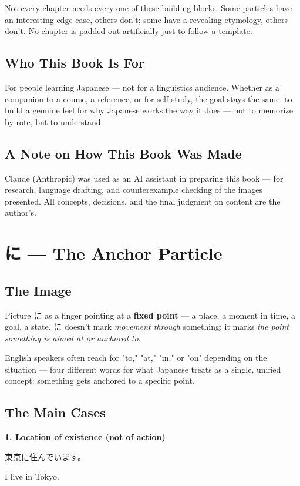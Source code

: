 \documentclass[12pt]{book}
\begin{document}
Not every chapter needs every one of these building blocks. Some particles have an interesting edge case, others don't; some have a revealing etymology, others don't. No chapter is padded out artificially just to follow a template.

\section*{Who This Book Is For}

For people learning Japanese — not for a linguistics audience. Whether as a companion to a course, a reference, or for self-study, the goal stays the same: to build a genuine feel for why Japanese works the way it does — not to memorize by rote, but to understand.

\section*{A Note on How This Book Was Made}

Claude (Anthropic) was used as an AI assistant in preparing this book — for research, language drafting, and counterexample checking of the images presented. All concepts, decisions, and the final judgment on content are the author's.


\chapter{に — The Anchor Particle}

\section*{The Image}

Picture に as a finger pointing at a \textbf{fixed point} — a place, a moment in time, a goal, a state. に doesn't mark \emph{movement through} something; it marks \emph{the point something is aimed at or anchored to}.

English speakers often reach for "to," "at," "in," or "on" depending on the situation — four different words for what Japanese treats as a single, unified concept: something gets anchored to a specific point.

\section*{The Main Cases}

\textbf{1. Location of existence (not of action)}
\par\quad 東京に住んでいます。\\
\par\quad I live in Tokyo.\\
\end{document}
